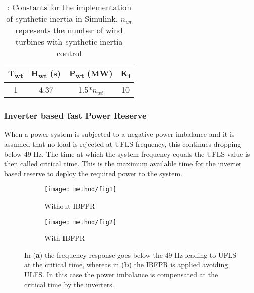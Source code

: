 \begin{table}[h]
	\caption{\label{tb:inertia}: Constants for the implementation of synthetic inertia in Simulink, $ n_{wt} $ represents the number of wind turbines with synthetic inertia control}
	\centering
	\begin{tabular}{cccc}
		\toprule
		\textbf{T\textsubscript{wt}} 	& \textbf{ H\textsubscript{wt} (s)}	& \textbf{ P\textsubscript{wt} (MW)}  & \textbf{ K\textsubscript{i}} \\
		\midrule
			1	       & 4.37		        &  1.5*$ n_{wt} $ & 10 \\
		\bottomrule
	\end{tabular}
\end{table}

\subsubsection{Inverter based fast Power Reserve}

When a power system is subjected to a negative power imbalance and it is assumed that no load is rejected at UFLS frequency, this continues dropping below 49 Hz. The time at which the system frequency equals the UFLS value is then called critical time. This is the maximum available time for the inverter based reserve to deploy the required power to the system.

\begin{figure}[h]
	\centering
	\begin{subfigure}[h]{0.45\textwidth}
		\centering
		\texttt{[image: method/fig1]}
		\caption{Without IBFPR}
		\label{fig:freqresp_before}
	\end{subfigure}
	\hfill
	\begin{subfigure}[h]{0.45\textwidth}
		\centering
		\texttt{[image: method/fig2]}
		\caption{With IBFPR}
		\label{fig:freqresp_after}
	\end{subfigure}


	\caption{In (\textbf{a}) the frequency response goes below the 49 Hz leading to UFLS at the critical time, whereas in (\textbf{b}) the IBFPR is applied avoiding ULFS. In this case the power imbalance is compensated at the critical time by the inverters.}
\end{figure}

